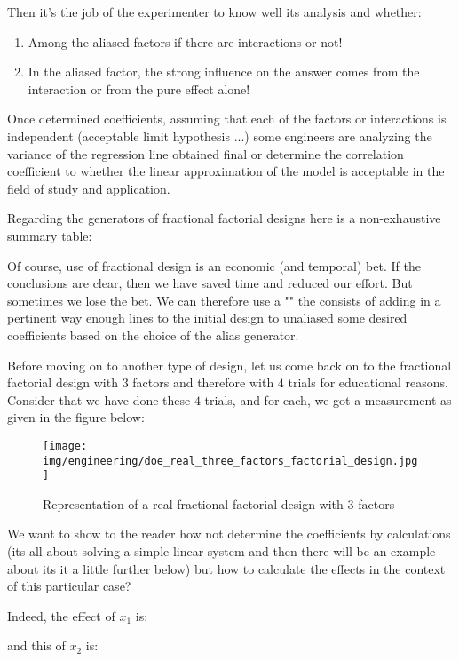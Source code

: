 	Then it's the job of the experimenter to know well its analysis and whether:
	\begin{enumerate}
		\item Among the aliased factors if there are interactions or not!

		\item In the aliased factor, the strong influence on the answer comes from the interaction or from the pure effect alone!
	\end{enumerate}
	Once determined coefficients, assuming that each of the factors or interactions is independent (acceptable limit hypothesis ...) some engineers are analyzing the variance of the regression line obtained final or determine the correlation coefficient to whether the linear approximation of the model is acceptable in the field of study and application.
	
	Regarding the generators of fractional factorial designs here is a non-exhaustive summary table:
	
	Of course, use of fractional design is an economic (and temporal) bet. If the conclusions are clear, then we have saved time and reduced our effort. But sometimes we lose the bet. We can therefore use a "" the consists of adding in a pertinent way enough lines to the initial design to unaliased some desired coefficients based on the choice of the alias generator.
	
	Before moving on to another type of design, let us come back on to the fractional factorial design with $3$ factors and therefore with $4$ trials for educational reasons. Consider that we have done these $4$ trials, and for each, we got a measurement as given in the figure below:
	\begin{figure}[H]
		\begin{center}
		\texttt{[image: img/engineering/doe\_real\_three\_factors\_factorial\_design.jpg]}
		\end{center}	
		\caption{Representation of a real fractional factorial design with $3$ factors}
	\end{figure}
	We want to show to the reader how not determine the coefficients by calculations (its all about solving a simple linear system and then there will be an example about its it a little further below) but how to calculate the effects in the context of this particular case?

	Indeed, the effect of $x_1$ is:
	
	and this of $x_2$ is:
	
